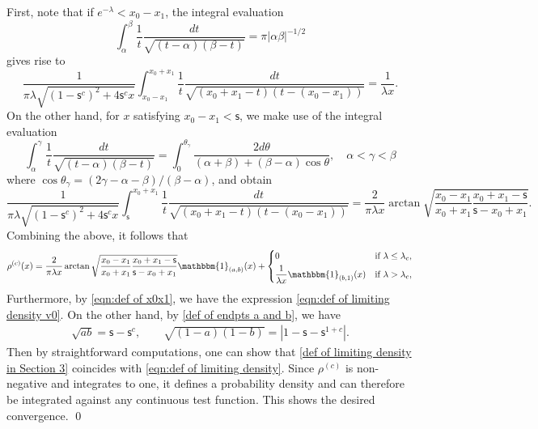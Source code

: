 \documentclass{amsart}
\theoremstyle{plain}
\theoremstyle{remark}
\newcommand{\abs}[1]{\lvert#1\rvert}
\numberwithin{equation}{section}
\begin{document}
First, note that if $e^{-\lambda}<x_0 -x_1$, the integral evaluation
\begin{equation*}
    \int_{\alpha}^{\beta}\frac{1}{t}\frac{dt}{\sqrt{(t-\alpha)(\beta-t)}}=\pi\abs{\alpha \beta}^{-1/2} 
\end{equation*}
gives rise to 
\begin{equation}
    \frac{1}{\pi\lambda \sqrt{(1-\mathsf{s}^{c})^2+4\mathsf{s}^{c}x}}\int_{x_0-x_1}^{x_0 +x_1}\frac{1}{t}\frac{dt}{\sqrt{(x_0+x_1 -t)(t-(x_0 -x_1))}}=\frac{1}{\lambda x}. 
\end{equation} 
On the other hand, for $x$ satisfying $x_0-x_1<\mathsf{s}$, we make use of the integral evaluation
\begin{equation*}
    \int_{\alpha}^{\gamma}\frac{1}{t}\frac{dt}{\sqrt{(t-\alpha)(\beta-t)}}
    =\int_{0}^{\theta_{\gamma}}\frac{2 d\theta}{({\alpha+\beta})+({\beta-\alpha})\cos\theta},\quad \alpha<\gamma<\beta
\end{equation*}
where $\cos\theta_{\gamma}=(2\gamma-\alpha-\beta)/(\beta-\alpha)$, and obtain 
\begin{equation}
    \frac{1}{\pi\lambda \sqrt{(1-\mathsf{s}^{c})^2+4\mathsf{s}^{c}x}}\int_{\mathsf{s}}^{x_0 +x_1}\frac{1}{t}\frac{dt}{\sqrt{(x_0+x_1 -t)(t-(x_0 -x_1))}}
    =\frac{2}{\pi\lambda x}\arctan\sqrt{\frac{x_0-x_1}{x_0 +x_1}\frac{{x_0+x_1-\mathsf{s}}}{{\mathsf{s}-x_0+x_1}}}.
\end{equation}
Combining the above, it follows that 
\begin{equation} \label{def of limiting density in Section 3}
            \rho^{(c)}(x)
            =\frac{2}{\pi\lambda x}\arctan\sqrt{\frac{x_0-x_1}{x_0 +x_1}\frac{{x_0+x_1- \mathsf{s}  }}{{ \mathsf{s} -x_0+x_1}}}\mathbbm{1}_{(a,b)}(x) +\begin{cases}
                0& \textup{if } \lambda \leq \lambda_c , \smallskip \\
                \displaystyle\frac{1}{\lambda x}\mathbbm{1}_{(b,1)}(x) & \textup{if } \lambda > \lambda_c,
            \end{cases} 
    \end{equation} 
Furthermore, by \eqref{eqn:def of x0x1}, we have the expression \eqref{eqn:def of limiting density v0}. 
On the other hand, by \eqref{def of endpts a and b}, we have  
\begin{align*}
\sqrt{ab}=\mathsf{s}-\mathsf{s}^c,\qquad  \sqrt{(1-a)(1-b)}=|1-\mathsf{s}-\mathsf{s}^{1+c}|. 
\end{align*} 
Then by straightforward computations, one can show that \eqref{def of limiting density in Section 3} coincides with \eqref{eqn:def of limiting density}.  
Since $\rho^{(c)}$ is non-negative and integrates to one, it defines a probability density and can therefore be integrated against any continuous test function. This shows the desired convergence. 
\qed 
\end{document}
